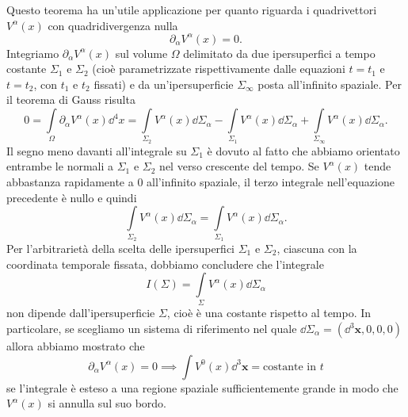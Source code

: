Questo teorema ha un'utile applicazione per quanto riguarda i quadrivettori
$V^{\alpha}(x)$ con quadridivergenza nulla
\begin{equation}
  \partial_{\alpha}V^{\alpha}(x) = 0.
\end{equation}
Integriamo $\partial_{\alpha}V^{\alpha}(x)$ sul volume $\Omega$ delimitato da
due ipersuperfici a tempo costante $\Sigma_{1}$ e $\Sigma_{2}$ (cioè
parametrizzate rispettivamente dalle equazioni $t = t_{1}$ e $t = t_{2}$, con
$t_{1}$ e $t_{2}$ fissati) e da un'ipersuperficie $\Sigma_{\infty}$ posta
all'infinito spaziale.  Per il teorema di Gauss risulta
\begin{equation}
  0 = \int\limits_{\Omega} \partial_{\alpha}V^{\alpha}(x) \dd^{4}x =
  \int\limits_{\Sigma_{2}} V^{\alpha}(x) \dd\Sigma_{\alpha} -
  \int\limits_{\Sigma_{1}} V^{\alpha}(x) \dd\Sigma_{\alpha} +
  \int\limits_{\Sigma_{\infty}} V^{\alpha}(x) \dd\Sigma_{\alpha}.
\end{equation}
Il segno meno davanti all'integrale su $\Sigma_{1}$ è dovuto al fatto che
abbiamo orientato entrambe le normali a $\Sigma_{1}$ e $\Sigma_{2}$ nel verso
crescente del tempo.  Se $V^{\alpha}(x)$ tende abbastanza rapidamente a $0$
all'infinito spaziale, il terzo integrale nell'equazione precedente è nullo e
quindi
\begin{equation}
  \int\limits_{\Sigma_{2}} V^{\alpha}(x) \dd\Sigma_{\alpha} =
  \int\limits_{\Sigma_{1}} V^{\alpha}(x) \dd\Sigma_{\alpha}.
\end{equation}
Per l'arbitrarietà della scelta delle ipersuperfici $\Sigma_{1}$ e $\Sigma_{2}$,
ciascuna con la coordinata temporale fissata, dobbiamo concludere che
l'integrale
\begin{equation}
  I(\Sigma) = \int\limits_{\Sigma} V^{\alpha}(x) \dd\Sigma_{\alpha}
\end{equation}
non dipende dall'ipersuperficie $\Sigma$, cioè è una costante rispetto al tempo.
In particolare, se scegliamo un sistema di riferimento nel quale
$\dd\Sigma_{\alpha} = (\dd^{3} \bm{x}, 0, 0, 0)$ allora abbiamo mostrato che
\begin{equation}
  \partial_{\alpha}V^{\alpha}(x) = 0 \implies \int V^{0}(x) \dd^{3} \bm{x} =
  \text{costante in $t$}
\end{equation}
se l'integrale è esteso a una regione spaziale sufficientemente grande in modo
che $V^{\alpha}(x)$ si annulla sul suo bordo.

